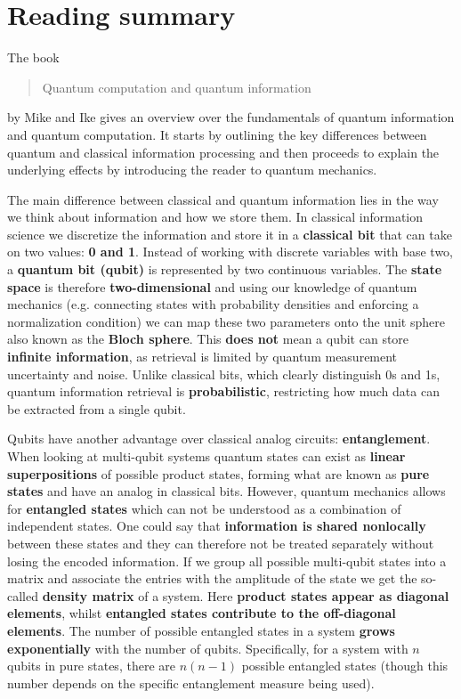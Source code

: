 \documentclass{alex_summary}
\begin{document}
\section*{Reading summary}

The book \blockcquote{nielsen2010quantum}{Quantum computation and quantum information} by Mike and Ike gives an overview over the fundamentals of quantum information and quantum computation. It starts by outlining the key differences between quantum and classical information processing and then proceeds to explain the underlying effects by introducing the reader to quantum mechanics.

The main difference between classical and quantum information lies in the way we think about information and how we store them. In classical information science we discretize the information and store it in a \textbf{classical bit} that can take on two values: \textbf{0 and 1}. Instead of working with discrete variables with base two, a \textbf{quantum bit (qubit)} is represented by two continuous variables. The \textbf{state space} is therefore \textbf{two-dimensional} and using our knowledge of quantum mechanics (e.g. connecting states with probability densities and enforcing a normalization condition) we can map these two parameters onto the unit sphere also known as the \textbf{Bloch sphere}. This \textbf{does not} mean a qubit can store \textbf{infinite information}, as retrieval is limited by quantum measurement uncertainty and noise. Unlike classical bits, which clearly distinguish 0s and 1s, quantum information retrieval is \textbf{probabilistic}, restricting how much data can be extracted from a single qubit.

Qubits have another advantage over classical analog circuits: \textbf{entanglement}. When looking at multi-qubit systems quantum states can exist as \textbf{linear superpositions} of possible product states, forming what are known as \textbf{pure states} and have an analog in classical bits. However, quantum mechanics allows for \textbf{entangled states} which can not be understood as a combination of independent states. One could say that \textbf{information is shared nonlocally} between these states and they can therefore not be treated separately without losing the encoded information. If we group all possible multi-qubit states into a matrix and associate the entries with the amplitude of the state we get the so-called \textbf{density matrix} of a system. Here \textbf{product states appear as diagonal elements}, whilst \textbf{entangled states contribute to the off-diagonal elements}. The number of possible entangled states in a system \textbf{grows exponentially} with the number of qubits. Specifically, for a system with  \( n \) qubits in pure states, there are \( n(n−1) \) possible entangled states (though this number depends on the specific entanglement measure being used).\\
\end{document}
